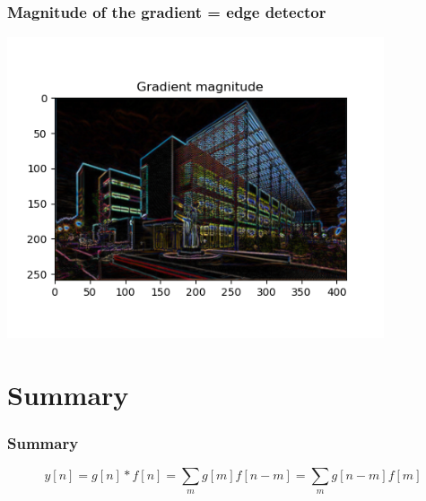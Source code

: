 \documentclass{beamer}
\begin{document}
\begin{frame}
  \frametitle{Magnitude of the gradient = edge detector}
      
  \centerline{\includegraphics[height=3.5in]{mp3fig9.png}}
\end{frame}

\section[Summary]{Summary}
\setcounter{subsection}{1}
\begin{frame}
  \frametitle{Summary}

    \[
    y[n] = g[n]\ast f[n] = \sum_m g[m] f[n-m] = \sum_m g[n-m] f[m]
    \]
\end{frame}
\end{document}
